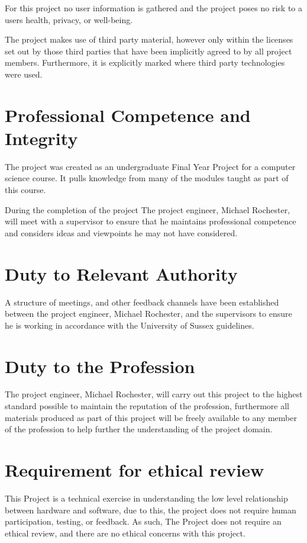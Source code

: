 \documentclass[a4paper]{report}
\begin{document}
For this project no user information is gathered and the project poses no risk to a users health, privacy, or well-being.

The project makes use of third party material, however only within the licenses set out by those third parties that have been implicitly agreed to by all project members. Furthermore, it is explicitly marked where third party technologies were used.


\section{Professional Competence and Integrity}

The project was created as an undergraduate Final Year Project for a computer science course. It pulls knowledge from many of the modules taught as part of this course.

During the completion of the project The project engineer, Michael Rochester, will meet with a supervisor to ensure that he maintains professional competence and considers ideas and viewpoints he may not have considered.

\section{Duty to Relevant Authority}

A structure of meetings, and other feedback channels have been established between the project engineer, Michael Rochester, and the supervisors to ensure he is working in accordance with the University of Sussex guidelines.

\section{Duty to the Profession}

The project engineer, Michael Rochester, will carry out this project to the highest standard possible to maintain the reputation of the profession, furthermore all materials produced as part of this project will be freely available to any member of the profession to help further the understanding of the project domain.

\section{Requirement for ethical review}

This Project is a technical exercise in understanding the low level relationship between hardware and software, due to this, the project does not require human participation, testing, or feedback. As such, The Project does not require an ethical review, and there are no ethical concerns with this project.
\end{document}
